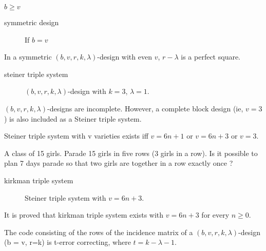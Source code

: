 \begin{theorem}
	$ b \ge v$
\end{theorem}

\begin{description}
	\item[symmetric design] If $b = v$
\end{description}

\begin{theorem}
	In a symmetric $(b,v,r,k,\lambda)$-design with even $v$, $r-\lambda$ is a perfect square.
\end{theorem}

\begin{description}
	\item[steiner triple system] $(b,v,r,k,\lambda)$-design with $k=3$, $\lambda=1$.
\end{description}

\begin{remark}
	$(b,v,r,k,\lambda)$-designs are incomplete. However, a complete block design (ie, $v = 3$) is also included as a Steiner triple system.
\end{remark}

\begin{theorem}
	Steiner triple system with v varieties exists iff $v = 6n+1$ or $v= 6n+3$ or $v = 3$.
\end{theorem}

\begin{definition}
	A class of 15 girls. Parade 15 girls in five rows (3 girls in a row). Is it possible to plan 7 days parade so that two girls are together in a row exactly once ?
\end{definition}

\begin{description}
	\item[kirkman triple system] Steiner triple system with $v = 6n+3$. 
\end{description}

\begin{remark}
	It is proved that kirkman triple system exists with $v = 6n+3$ for every $n \ge 0$.
\end{remark}

\begin{theorem}
	The code consisting of the rows of the incidence matrix of a $(b,v,r,k,\lambda)$-design (b = v, r=k) is t-error correcting, where $t = k-\lambda-1$.
\end{theorem}

